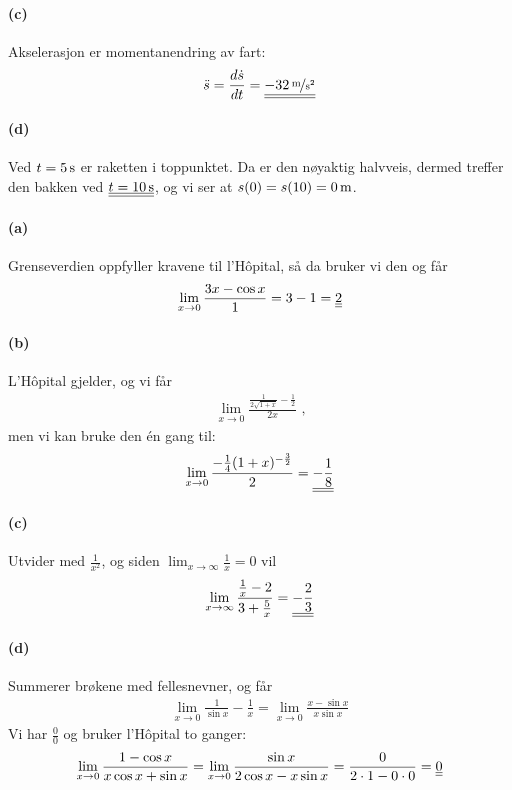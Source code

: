 \documentclass[a4paper,norsk,12pt]{article}
\begin{document}
\paragraph{(c)}
Akselerasjon er momentanendring av fart:
\begin{align*}
  \ddot{s} = \frac{d\dot{s}}{dt} = \svar{\unitfrac[-32]{m}{s^2}}
\end{align*}

\paragraph{(d)}
Ved $t=\unit[5]{s}$ er raketten i toppunktet. Da er den nøyaktig halvveis,
dermed treffer den bakken ved $\svar{t=\unit[10]{s}}$, og vi ser at
$s(0) = s(10) = \unit[0]{m}$.

\paragraph{(a)}
Grenseverdien oppfyller kravene til l'Hôpital, så da bruker vi den og får
\begin{align*}
  \lim_{x\to 0}{\frac{3x-\cos{x}}{1}} = 3 - 1 = {\underline{\underline{2}}}
\end{align*}

\paragraph{(b)}
L'Hôpital gjelder, og vi får
\begin{align*}
  \lim_{x\to 0}\frac{ \frac{1}{2\sqrt{1+x}} -\frac{1}{2} }{2x} \text{ ,}
\end{align*}
men vi kan bruke den én gang til:
\begin{align*}
  \lim_{x\to 0}\frac{ -\frac{1}{4}(1+x)^{-\frac{3}{2}} }{2} =
    {\underline{\underline{-\frac{1}{8}}}}
\end{align*}

\paragraph{(c)}
Utvider med $\frac{1}{x^2}$, og siden $\lim_{x\to\infty}\frac{1}{x} = 0$ vil
\begin{align*}
  \lim_{x\to\infty}{\frac{\frac{1}{x}-2}{3+\frac{5}{x}}} = {\underline{\underline{-\frac{2}{3}}}} \\
\end{align*}

\paragraph{(d)}
Summerer brøkene med fellesnevner, og får
\begin{align*}
  \lim_{x\to 0}\frac{1}{\sin{x}} - \frac{1}{x} =
  \lim_{x\to 0}\frac{x - \sin{x}}{x\sin{x}}
\end{align*}
Vi har $\frac{0}{0}$ og bruker l'Hôpital to ganger:
\begin{align*}
  \lim_{x\to 0}\frac{1 - \cos{x}}{x\cos{x} + \sin{x}} =
  \lim_{x\to 0}{\frac{\sin{x}}{2\cos{x} - x\sin{x}}} =
  \frac{0}{2\cdot1 - 0 \cdot 0} = {\underline{\underline{0}}}
\end{align*}
\end{document}
